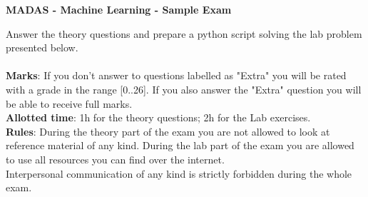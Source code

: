 \documentclass[13pt, a4paper]{exam}
\begin{document}
    \begin{center}
        \Large\textbf{MADAS - Machine Learning - Sample Exam}
    \end{center}

\noindent Answer the theory questions and prepare a python script solving the lab problem presented below.
\\
\\
\textbf{Marks}: If you don't answer to questions labelled as "Extra" you will be rated with a grade in the range [0..26]. If you also answer the "Extra" question you will be able to receive full marks.
\\
\textbf{Allotted time}: 1h for the theory questions; 2h for the Lab exercises.
\\
\textbf{Rules}: During the theory part of the exam you are not allowed to look at reference material of any kind. During the lab part of the exam you are allowed to use all resources you can find over the internet.
\\
Interpersonal communication of any kind is strictly forbidden during the whole exam.
\end{document}
